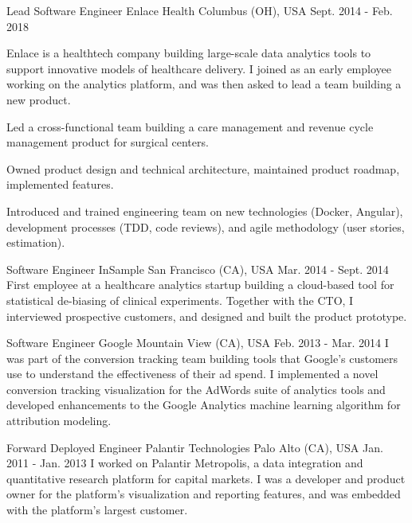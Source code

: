 \begin{cventries}
  \cventry
    {Lead Software Engineer} %
    {Enlace Health} %
    {Columbus (OH), USA} %
    {Sept. 2014 - Feb. 2018} %
    {
      Enlace is a healthtech company building large-scale data analytics tools to support innovative models of healthcare delivery. I joined as an early employee working on the  analytics platform, and was then asked to lead a team building a new product.
      \vspace{5.0mm}
      \begin{cvitems} %
        \item {Led a cross-functional team building a care management and revenue cycle management product for surgical centers.}
        \item {Owned product design and technical architecture, maintained product roadmap, implemented features.}
        \item {Introduced and trained engineering team on new technologies (Docker, Angular), development processes (TDD, code reviews), and agile methodology (user stories, estimation).}
      \end{cvitems}
    }

  \cventry
    {Software Engineer} %
    {InSample} %
    {San Francisco (CA), USA} %
    {Mar. 2014 - Sept. 2014} %
    {
      First employee at a healthcare analytics startup building a cloud-based tool for statistical de-biasing of clinical experiments. Together with the CTO, I interviewed prospective customers, and designed and built the product prototype.
      \vspace{3.0mm}
    }

  \cventry
    {Software Engineer} %
    {Google} %
    {Mountain View (CA), USA} %
    {Feb. 2013 - Mar. 2014} %
    {
      I was part of the conversion tracking team building tools that Google's customers use to understand the effectiveness of their ad spend. I implemented a novel conversion tracking visualization for the AdWords suite of analytics tools and developed enhancements to the Google Analytics machine learning algorithm for attribution modeling.
      \vspace{3.0mm}
    }

  \cventry
    {Forward Deployed Engineer} %
    {Palantir Technologies} %
    {Palo Alto (CA), USA} %
    {Jan. 2011 - Jan. 2013} %
    {
      I worked on Palantir Metropolis, a data integration and quantitative research platform for capital markets. I was a developer and product owner for the platform's visualization and reporting features, and was embedded with the platform's largest customer.
    }

\end{cventries}
